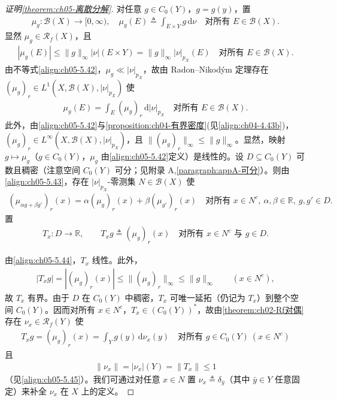 \documentclass[../../main.tex]{subfiles}%
\begin{document}
\begin{proof}[证明\cref{theorem:ch05-离散分解}]
对任意 $g\in C_0(Y)$，$g=g(y)$，置
\begin{align*}
\mu_g:\mathscr{B}(X)\to[0,\infty),\quad
\mu_g(E)\triangleq \int_{E\times Y}g\,\mathrm{d}\nu
\quad\text{对所有 }E\in\mathscr{B}(X).
\end{align*}
显然 $\mu_g\in\mathscr{R}_f(X)$，且
\begin{align}
|\mu_g(E)|\leqslant\|g\|_\infty|\nu|(E\times Y)
=\|g\|_\infty|\nu|_{p_X}(E)
\quad\text{对所有 }E\in\mathscr{B}(X).\label{align:ch05-5.42}
\end{align}
由不等式\eqref{align:ch05-5.42}，$\mu_g\ll|\nu|_{p_X}$，故由 Radon–Nikodým 定理存在 $(\mu_g)_r\in L^1(X,\mathscr{B}(X),|\nu|_{p_X})$ 使
\begin{align}
\mu_g(E)=\int_E(\mu_g)_r\,\mathrm{d}|\nu|_{p_X}
\quad\text{对所有 }E\in\mathscr{B}(X).\label{align:ch05-5.43}
\end{align}
此外，由\eqref{align:ch05-5.42}与\cref{proposition:ch04-有界密度}(见\eqref{align:ch04-4.43b})，$(\mu_g)_r\in L^\infty(X,\mathscr{B}(X),|\nu|_{p_X})$，且 $\|(\mu_g)_r\|_\infty\leqslant\|g\|_\infty$。显然，映射 $g\mapsto\mu_g$（$g\in C_0(Y)$，$\mu_g$ 由\eqref{align:ch05-5.42}定义）是线性的。设 $D\subseteq C_0(Y)$ 可数且稠密（注意空间 $C_0(Y)$ 可分；见附录 A,\cref{paragraph:appA-可分}）。则由\eqref{align:ch05-5.43}，存在 $|\nu|_{p_X}$-零测集 $N\in\mathscr{B}(X)$ 使
\begin{align}
(\mu_{\alpha g+\beta g'})_r(x)=\alpha(\mu_g)_r(x)+\beta(\mu_{g'})_r(x)
\quad\text{对所有 }x\in N^c,\ \alpha,\beta\in\mathbb{R},\ g,g'\in D.\label{align:ch05-5.44}
\end{align}
置
\begin{align*}
T_x:D\to\mathbb{R},\qquad T_xg\triangleq (\mu_g)_r(x)
\quad\text{对所有 }x\in N^c\text{ 与 }g\in D.
\end{align*}

由\eqref{align:ch05-5.44}，$T_x$ 线性。此外，
\begin{align}
|T_xg|=|(\mu_g)_r(x)|\leqslant\|(\mu_g)_r\|_\infty\leqslant\|g\|_\infty
\qquad(x\in N^c),\label{align:ch05-5.45}
\end{align}
故 $T_x$ 有界。由于 $D$ 在 $C_0(Y)$ 中稠密，$T_x$ 可唯一延拓（仍记为 $T_x$）到整个空间 $C_0(Y)$。因而对所有 $x\in N^c$，$T_x\in(C_0(Y))^*$，故由\cref{theorem:ch02-Rf对偶}存在 $\nu_x\in\mathscr{R}_f(Y)$ 使
\begin{align}
T_xg=(\mu_g)_r(x)=\int_Y g(y)\,\mathrm{d}\nu_x(y)
\quad\text{对所有 }g\in C_0(Y)\ (x\in N^c)\label{align:ch05-5.46}
\end{align}
且
\begin{align}
\|\nu_x\|=|\nu_x|(Y)=\|T_x\|\leqslant1\label{align:ch05-5.47}
\end{align}
（见\eqref{align:ch05-5.45}）。我们可通过对任意 $x\in N$ 置 $\nu_x\triangleq \delta_{\bar{y}}$（其中 $\bar{y}\in Y$ 任意固定）来补全 $\nu_x$ 在 $X$ 上的定义。


\end{proof}
\end{document}
